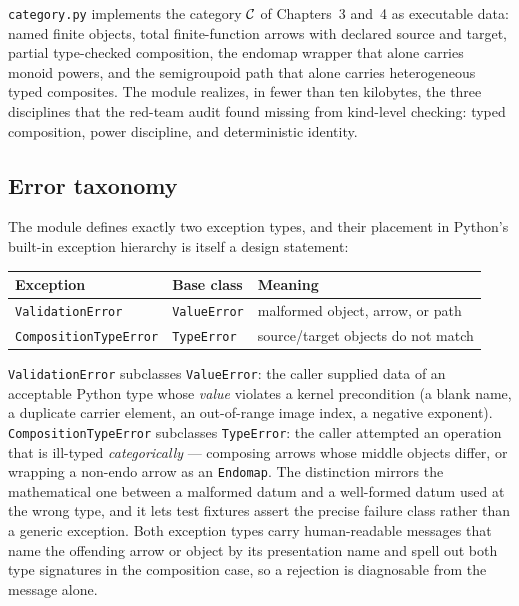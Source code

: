 \texttt{category.py} implements the category $\mathcal{C}$ of Chapters~3 and~4 as
executable data: named finite objects, total finite-function arrows with
declared source and target, partial type-checked composition, the endomap
wrapper that alone carries monoid powers, and the semigroupoid path that
alone carries heterogeneous typed composites. The module realizes, in fewer
than ten kilobytes, the three disciplines that the red-team audit found
missing from kind-level checking: typed composition, power discipline, and
deterministic identity.

\subsection{Error taxonomy}\label{ch09:sec:cat-errors}

The module defines exactly two exception types, and their placement in
Python's built-in exception hierarchy is itself a design statement:

\begin{center}
\begin{tabular}{@{}lll@{}}
\toprule
Exception & Base class & Meaning \\
\midrule
\texttt{ValidationError} & \texttt{ValueError} & malformed object, arrow, or path \\
\texttt{CompositionTypeError} & \texttt{TypeError} & source/target objects do not match \\
\bottomrule
\end{tabular}
\end{center}

\texttt{ValidationError} subclasses \texttt{ValueError}: the caller supplied
data of an acceptable Python type whose \emph{value} violates a kernel
precondition (a blank name, a duplicate carrier element, an out-of-range
image index, a negative exponent). \texttt{CompositionTypeError} subclasses
\texttt{TypeError}: the caller attempted an operation that is ill-typed
\emph{categorically} --- composing arrows whose middle objects differ, or
wrapping a non-endo arrow as an \texttt{Endomap}. The distinction mirrors
the mathematical one between a malformed datum and a well-formed datum used
at the wrong type, and it lets test fixtures assert the precise failure
class rather than a generic exception. Both exception types carry
human-readable messages that name the offending arrow or object by its
presentation name and spell out both type signatures in the composition
case, so a rejection is diagnosable from the message alone.


